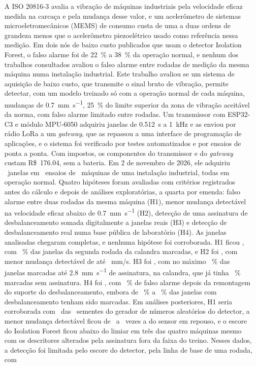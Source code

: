 \begin{resumo}
A ISO 20816-3 avalia a vibração de máquinas industriais pela velocidade eficaz medida na carcaça e pela mudança desse valor, e um acelerômetro de sistemas microeletromecânicos (MEMS) de consumo custa de uma a duas ordens de grandeza menos que o acelerômetro piezoelétrico usado como referência nessa medição. Em dois nós de baixo custo publicados que usam o detector Isolation Forest, o falso alarme foi de \SI{22}{\percent} a \SI{38}{\percent} da operação normal, e nenhum dos trabalhos consultados avaliou o falso alarme entre rodadas de medição da mesma máquina numa instalação industrial. Este trabalho avaliou se um sistema de aquisição de baixo custo, que transmite o sinal bruto de vibração, permite detectar, com um modelo treinado só com a operação normal de cada máquina, mudanças de \SI{0,7}{\milli\meter\per\second}, \SI{25}{\percent} do limite superior da zona de vibração aceitável da norma, com falso alarme limitado entre rodadas. Um transmissor com ESP32-C3 e módulo MPU-6050 adquiriu janelas de \SI{0,512}{\second} a \SI{1}{\kilo\hertz} e as enviou por rádio LoRa a um \textit{gateway}, que as repassou a uma interface de programação de aplicações, e o sistema foi verificado por testes automatizados e por ensaios de ponta a ponta. Com impostos, os componentes do transmissor e do \textit{gateway} custam R\$~\num{176,04}, sem a bateria. Em 2 de novembro de 2026, ele adquiriu \campoJanelasOperacao\ janelas em \campoEnsaios\ ensaios de \campoMaquinas\ máquinas de uma instalação industrial, todas em operação normal. Quatro hipóteses foram avaliadas com critérios registrados antes do cálculo e depois de análises exploratórias, a quarta por emenda: falso alarme entre duas rodadas da mesma máquina (H1), menor mudança detectável na velocidade eficaz abaixo de \SI{0,7}{\milli\meter\per\second} (H2), detecção de uma assinatura de desbalanceamento somada digitalmente a janelas reais (H3) e detecção de desbalanceamento real numa base pública de laboratório (H4). As janelas analisadas chegaram completas, e nenhuma hipótese foi corroborada. H1 ficou \hUmVeredito, com \hUmCalandraIFDireto~\% das janelas da segunda rodada da calandra marcadas, e H2 foi \hDoisVeredito, com menor mudança detectável de até \hDoisMmdCalandraDois~mm/s. H3 foi \hTresVeredito, com no máximo \hTresFracaoMaxCalandra~\% das janelas marcadas até \SI{2,8}{\milli\meter\per\second} de assinatura, na calandra, que já tinha \apUmFracaoSemAssinaturaCalandra~\% marcadas sem assinatura. H4 foi \hQuatroVeredito, com \hQuatroFracaoZero~\% de falso alarme depois da remontagem do suporte do desbalanceamento, embora de \hQuatroFracaoTres~\% a \hQuatroFracaoQuatro~\% das janelas com desbalanceamento tenham sido marcadas. Em análises posteriores, H1 seria corroborada com \apTresVereditoUmCorroborada\ das \apTresSementes\ sementes do gerador de números aleatórios do detector, a menor mudança detectável ficou de \apCincoRazaoMin\ a \apCincoRazaoMax\ vezes a do sensor em repouso, e o escore do Isolation Forest ficou abaixo do limiar em três das quatro máquinas mesmo com os descritores alterados pela assinatura fora da faixa do treino. Nesses dados, a detecção foi limitada pelo escore do detector, pela linha de base de uma rodada, com 
\end{resumo}
